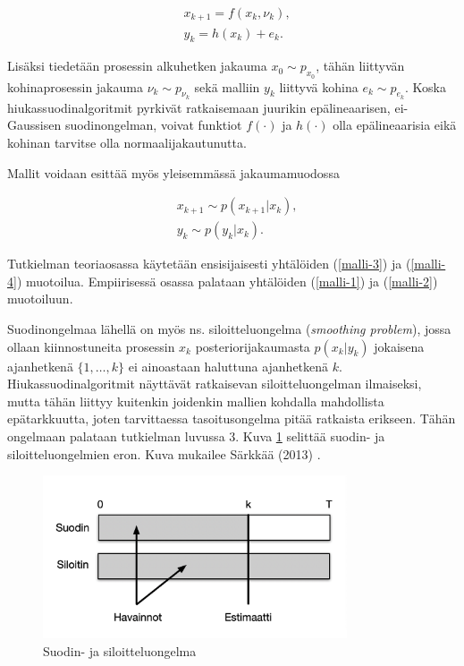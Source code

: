 \documentclass[
  12pt,
  a4paper, twoside]{book}
\begin{document}
\begin{align}
&\label{malli-1} x_{k+1} = f(x_k, \nu_k),\\
&\label{malli-2} y_{k} = h(x_k)+e_k.
\end{align}

Lisäksi tiedetään prosessin alkuhetken jakauma \(x_0 \sim p_{x_{0}}\), tähän liittyvän kohinaprosessin jakauma \(\nu_k \sim p_{\nu_{k}}\) sekä malliin \(y_k\) liittyvä kohina \(e_k \sim p_{e_k}\). Koska hiukassuodinalgoritmit pyrkivät ratkaisemaan juurikin epälineaarisen, ei-Gaussisen suodinongelman, voivat funktiot \(f(\cdot)\) ja \(h(\cdot)\) olla epälineaarisia eikä kohinan tarvitse olla normaalijakautunutta.

Mallit voidaan esittää myös yleisemmässä jakaumamuodossa

\begin{align}
&\label{malli-3} x_{k+1} \sim p(x_{k+1}|x_k),\\
&\label{malli-4} y_{k} \sim p(y_k|x_k).
\end{align}

Tutkielman teoriaosassa käytetään ensisijaisesti yhtälöiden (\ref{malli-3}) ja (\ref{malli-4}) muotoilua. Empiirisessä osassa palataan yhtälöiden (\ref{malli-1}) ja (\ref{malli-2}) muotoiluun.

Suodinongelmaa lähellä on myös ns. siloitteluongelma (\emph{smoothing problem}), jossa ollaan kiinnostuneita prosessin \(x_k\) posteriorijakaumasta \(p(x_k|y_k)\) jokaisena ajanhetkenä \(\{1,\ldots,k\}\) ei ainoastaan haluttuna ajanhetkenä \(k\). Hiukassuodinalgoritmit näyttävät ratkaisevan siloitteluongelman ilmaiseksi, mutta tähän liittyy kuitenkin joidenkin mallien kohdalla mahdollista epätarkkuutta, joten tarvittaessa tasoitusongelma pitää ratkaista erikseen. Tähän ongelmaan palataan tutkielman luvussa 3. Kuva \ref{fig:suodin_vs_siloitin} selittää suodin- ja siloitteluongelmien eron. Kuva mukailee Särkkää (2013) \citep{sarkka-2013}.

\begin{figure}[H]
\centering
\includegraphics[width=9cm]{suodin_vs_siloitin_cropped}
\caption{Suodin- ja siloitteluongelma}
\label{fig:suodin_vs_siloitin}
\end{figure}
\end{document}
